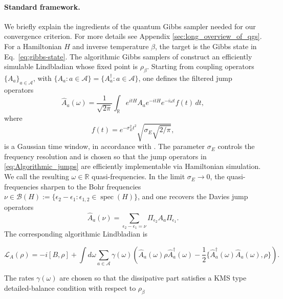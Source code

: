 \documentclass[showpacs,amsmath,amssymb,twocolumn,prx,superscriptaddress,10pt,aps,nofootinbib]{revtex4-2}
\begin{document}
\paragraph{Standard framework.} We briefly explain the ingredients of the quantum Gibbs sampler needed for our convergence criterion. For more details see Appendix \ref{sec:long_overview_of_qgs}. For a Hamiltonian $H$ and inverse temperature $\beta$, the target is the Gibbs state in Eq.~\eqref{eq:gibbs-state}.
The algorithmic Gibbs samplers of \cite{chen2025efficient, Chen2023a, Chen2023b} construct an efficiently simulable Lindbladian whose fixed point is $\rho_\beta$. Starting from coupling operators $\{A_a\}_{a\in\mathcal{A}}$, with $\{A_a:a\in\mathcal{A}\}=\{A_a^\dagger:a\in\mathcal{A}\}$, one defines the filtered jump operators
\begin{equation}
\label{eq:Algorithmic_jumps}
\hat A_a(\omega)
=
\frac{1}{\sqrt{2\pi}}
\int_{\mathbb{R}} e^{itH}A_a e^{-itH} e^{-i\omega t} f(t)\,dt,
\end{equation}
where 
\begin{equation}\label{eq:Gaussian_window_time}
   f(t)=e^{-\sigma_E^2 t^2}\sqrt{\sigma_E\sqrt{2/\pi}},
\end{equation} 
is a Gaussian time window, in accordance with \cite[App. D]{Chen2023b}. The parameter $\sigma_E$ controls the frequency resolution and is chosen so that the jump operators in \eqref{eq:Algorithmic_jumps} are efficiently implementable via Hamiltonian simulation. We call the resulting $\omega\in\mathbb{R}$ quasi-frequencies. In the limit $\sigma_E\to 0$, the quasi-frequencies sharpen to the Bohr frequencies $\nu\in\mathcal{B}(H):=\{\epsilon_2-\epsilon_1:\epsilon_{1,2}\in\operatorname{spec}(H)\}$, and one recovers the Davies jump operators
\begin{equation}
\hat A_a(\nu)
=
\sum_{\epsilon_2-\epsilon_1=\nu}\Pi_{\epsilon_2}A_a\Pi_{\epsilon_1}.
\end{equation}
The corresponding algorithmic Lindbladian is
\begin{widetext}
\begin{equation}
\label{eq:Algorithmic_lindbladian}
\mathcal{L}_A(\rho)
=
-i[B,\rho]
+
\int d\omega \sum_{a\in\mathcal{A}} \gamma(\omega)
\left(
\hat A_a(\omega)\rho \hat A_a^\dagger(\omega)
-\frac{1}{2}\{\hat A_a^\dagger(\omega)\hat A_a(\omega),\rho\}
\right).
\end{equation}
\end{widetext}
The rates $\gamma(\omega)$ are chosen so that the dissipative part satisfies a KMS type detailed-balance condition with respect to $\rho_\beta$ \cite{Ding2024}
\end{document}
